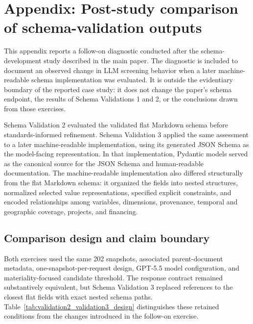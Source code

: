\documentclass{article}
\begin{document}
\clearpage

\section{Appendix: Post-study comparison of schema-validation outputs}
\label{appendix:post_study_validation_comparison}

This appendix reports a follow-on diagnostic conducted after the schema-development study described in the main paper. The diagnostic is included to document an observed change in LLM screening behavior when a later machine-readable schema implementation was evaluated. It is outside the evidentiary boundary of the reported case study: it does not change the paper's schema endpoint, the results of Schema Validations 1 and 2, or the conclusions drawn from those exercises.

Schema Validation 2 evaluated the validated flat Markdown schema before standards-informed refinement. Schema Validation 3 applied the same assessment to a later machine-readable implementation, using its generated JSON Schema as the model-facing representation. In that implementation, Pydantic models served as the canonical source for the JSON Schema and human-readable documentation. The machine-readable implementation also differed structurally from the flat Markdown schema: it organized the fields into nested structures, normalized selected value representations, specified explicit constraints, and encoded relationships among variables, dimensions, provenance, temporal and geographic coverage, projects, and financing.

\subsection{Comparison design and claim boundary}

Both exercises used the same 202 snapshots, associated parent-document metadata, one-snapshot-per-request design, GPT-5.5 model configuration, and materiality-focused candidate threshold. The response contract remained substantively equivalent, but Schema Validation 3 replaced references to the closest flat fields with exact nested schema paths. Table~\ref{tab:validation2_validation3_design} distinguishes these retained conditions from the changes introduced in the follow-on exercise.
\end{document}

